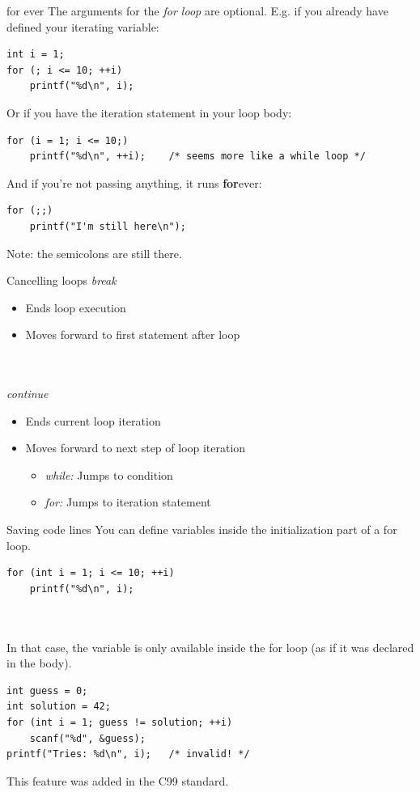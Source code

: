 \begin{frame}[fragile]{for ever}
	The arguments for the \textit{for loop} are optional. E.g. if you already have defined your iterating variable:
	\begin{lstlisting}[numbers=none]
int i = 1;
for (; i <= 10; ++i)
	printf("%d\n", i);
\end{lstlisting}
	Or if you have the iteration statement in your loop body:
	\begin{lstlisting}[numbers=none]
for (i = 1; i <= 10;)
	printf("%d\n", ++i);	/* seems more like a while loop */
\end{lstlisting}
	And if you're not passing anything, it runs \textbf{for}ever:
	\begin{lstlisting}[numbers=none]
for (;;)
	printf("I'm still here\n");
\end{lstlisting}
Note: the semicolons are still there.
\end{frame}

\begin{frame}{Cancelling loops}
	\textit{break}
	\begin{itemize}
		\item Ends loop execution
		\item Moves forward to first statement after loop
	\end{itemize}\ \\\ \\
	\textit{continue}
	\begin{itemize}
		\item Ends current loop iteration
		\item Moves forward to next step of loop iteration
		\begin{itemize}
			\item\textit{while:} Jumps to condition
			\item\textit{for:} Jumps to iteration statement
		\end{itemize}
	\end{itemize}
\end{frame}

\begin{frame}[fragile]{Saving code lines}
	You can define variables inside the initialization part of a for loop.
	\begin{lstlisting}[numbers=none]
for (int i = 1; i <= 10; ++i)
	printf("%d\n", i);
\end{lstlisting}
	\ \\\ \\In that case, the variable is only available inside the for loop (as if it was declared in the body).\\
	\begin{lstlisting}
int guess = 0;
int solution = 42;
for (int i = 1; guess != solution; ++i)
	scanf("%d", &guess);
printf("Tries: %d\n", i);	/* invalid! */
\end{lstlisting}
	This feature was added in the C99 standard.
\end{frame}

